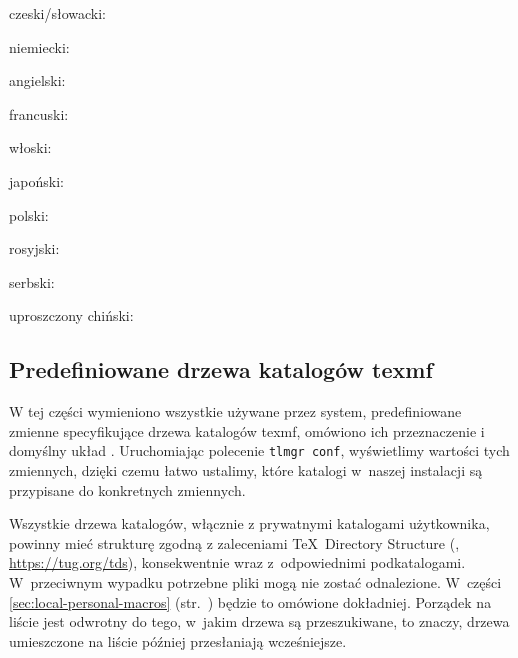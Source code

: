 \documentclass{article}
\begin{document}
\begin{itemize*}
\item{czeski/słowacki:} 
\item{niemiecki:} 
\item{angielski:} 
\item{francuski:} 
\item{włoski:} 
\item{japoński:} 
\item{polski:} 
\item{rosyjski:} 
\item{serbski:} 
\item{uproszczony chiński:} 
\end{itemize*}
  
\subsection{Predefiniowane drzewa katalogów texmf}
\label{sec:texmftrees}

W tej części wymieniono wszystkie używane przez system, predefiniowane
zmienne specyfikujące drzewa katalogów texmf, omówiono ich przeznaczenie i domyślny układ \TL{}.
Uruchomiając polecenie \texttt{tlmgr~conf}, wyświetlimy wartości tych
zmiennych, dzięki czemu łatwo ustalimy, które katalogi w~naszej instalacji są
przypisane do konkretnych zmiennych.

Wszystkie drzewa katalogów, włącznie z prywatnymi katalogami użytkownika,
powinny mieć strukturę zgodną z zaleceniami \TeX\
Directory Structure (\TDS, \url{https://tug.org/tds}), konsekwentnie wraz
z~odpowiednimi podkatalogami. W~przeciwnym wypadku potrzebne pliki mogą nie
zostać odnalezione. W~części \ref{sec:local-personal-macros}
(str.~\pageref{sec:local-personal-macros}) będzie to omówione dokładniej.
Porządek na liście jest odwrotny do tego, w~jakim drzewa są przeszukiwane, to
znaczy, drzewa umieszczone na liście później przesłaniają wcześniejsze.
\end{document}
